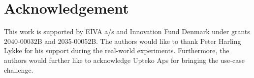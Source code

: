\documentclass[letterpaper, 10 pt, conference]{ieeeconf}  %
\begin{document}
\section{Acknowledgement}
{
This work is supported by EIVA a/s and Innovation Fund Denmark under grants 2040-00032B and 2035-00052B. The authors would like to thank Peter Harling Lykke for his support during the real-world experiments. Furthermore, the authors would further like to acknowledge Upteko Aps for bringing the use-case challenge.
}




























\addtolength{\textheight}{-12cm}   %













\end{document}
